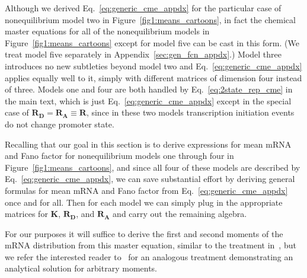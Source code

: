 Although we derived Eq.~\ref{eq:generic_cme_appdx} for the particular case of
nonequilibrium model two in Figure~\ref{fig1:means_cartoons}, in fact the
chemical master equations for all of the nonequilibrium models in
Figure~\ref{fig1:means_cartoons} except for model five can be cast in this form.
(We treat model five separately in Appendix~\ref{sec:gen_fcn_appdx}.) Model
three introduces no new subtleties beyond model two and
Eq.~\ref{eq:generic_cme_appdx} applies equally well to it, simply with different
matrices of dimension four instead of three. Models one and four are both
handled by Eq.~\ref{eq:2state_rep_cme} in the main text, which is just
Eq.~\ref{eq:generic_cme_appdx} except in the special case of $\mathbf{R_D} =
\mathbf{R_A} \equiv \mathbf{R}$, since in these two models transcription
initiation events do not change promoter state.

Recalling that our goal in this section is to derive expressions for mean mRNA
and Fano factor for nonequilibrium models one through four in
Figure~\ref{fig1:means_cartoons}, and since all four of these models are
described by Eq.~\ref{eq:generic_cme_appdx}, we can save substantial effort by
deriving general formulas for mean mRNA and Fano factor from
Eq.~\ref{eq:generic_cme_appdx} once and for all. Then for each model we can
simply plug in the appropriate matrices for $\mathbf{K}$, $\mathbf{R_D}$, and
$\mathbf{R_A}$ and carry out the remaining algebra.

For our purposes it will suffice to derive the first and second moments of the
mRNA distribution from this master equation, similar to the treatment
in~\cite{Sanchez2011}, but we refer the interested reader
to~\cite{Razo-Mejia2020} for an analogous treatment demonstrating an analytical
solution for arbitrary moments.

